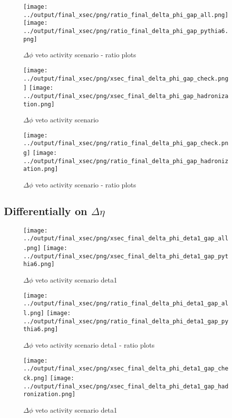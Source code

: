 \documentclass[11pt]{article}
\begin{document}
\begin{figure}[ht]
\centering
\texttt{[image: ../output/final\_xsec/png/ratio\_final\_delta\_phi\_gap\_all.png]}
\texttt{[image: ../output/final\_xsec/png/ratio\_final\_delta\_phi\_gap\_pythia6.png]}
\caption{$\Delta\phi$ veto activity scenario - ratio plots}
\label{fig:delta_phi_gap_ratio}
\end{figure}

\begin{figure}[ht]
\centering
\texttt{[image: ../output/final\_xsec/png/xsec\_final\_delta\_phi\_gap\_check.png]}
\texttt{[image: ../output/final\_xsec/png/xsec\_final\_delta\_phi\_gap\_hadronization.png]}
\caption{$\Delta\phi$ veto activity scenario}
\label{fig:delta_phi_gapb}
\end{figure}

\begin{figure}[ht]
\centering
\texttt{[image: ../output/final\_xsec/png/ratio\_final\_delta\_phi\_gap\_check.png]}
\texttt{[image: ../output/final\_xsec/png/ratio\_final\_delta\_phi\_gap\_hadronization.png]}
\caption{$\Delta\phi$ veto activity scenario - ratio plots}
\label{fig:delta_phi_gapb_ratio}
\end{figure}

\clearpage
\subsection{Differentially on $\Delta\eta$}


\begin{figure}[ht]
\centering
\texttt{[image: ../output/final\_xsec/png/xsec\_final\_delta\_phi\_deta1\_gap\_all.png]}
\texttt{[image: ../output/final\_xsec/png/xsec\_final\_delta\_phi\_deta1\_gap\_pythia6.png]}
\caption{$\Delta\phi$ veto activity scenario deta1}
\label{fig:delta_phi_gap_deta1}
\end{figure}

\begin{figure}[ht]
\centering
\texttt{[image: ../output/final\_xsec/png/ratio\_final\_delta\_phi\_deta1\_gap\_all.png]}
\texttt{[image: ../output/final\_xsec/png/ratio\_final\_delta\_phi\_deta1\_gap\_pythia6.png]}
\caption{$\Delta\phi$ veto activity scenario deta1 - ratio plots}
\label{fig:delta_phi_gap_deta1_ratio}
\end{figure}

\begin{figure}[ht]
\centering
\texttt{[image: ../output/final\_xsec/png/xsec\_final\_delta\_phi\_deta1\_gap\_check.png]}
\texttt{[image: ../output/final\_xsec/png/xsec\_final\_delta\_phi\_deta1\_gap\_hadronization.png]}
\caption{$\Delta\phi$ veto activity scenario deta1}
\label{fig:delta_phi_gap_deta1b}
\end{figure}
\end{document}
